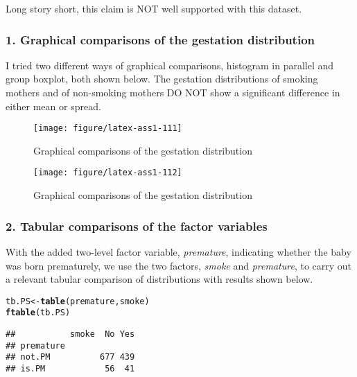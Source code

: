 \documentclass{article}\usepackage{graphicx, color}
\makeatletter
\newcommand{\hlfunctioncall}[1]{\textcolor[rgb]{0.501960784313725,0,0.329411764705882}{\textbf{#1}}}%
\newenvironment{kframe}{%
 \def\at@end@of@kframe{}%
 \ifinner\ifhmode%
  \def\at@end@of@kframe{\end{minipage}}%
  \begin{minipage}{\columnwidth}%
 \fi\fi%
 \def\FrameCommand##1{\hskip\@totalleftmargin \hskip-\fboxsep
 \colorbox{shadecolor}{##1}\hskip-\fboxsep
     \hskip-\linewidth \hskip-\@totalleftmargin \hskip\columnwidth}%
 \MakeFramed {\advance\hsize-\width
   \@totalleftmargin\z@ \linewidth\hsize
   \@setminipage}}%
 {\par\unskip\endMakeFramed%
 \at@end@of@kframe}
\newenvironment{knitrout}{}{} %
\makeatother
\begin{document}
\hspace{12 pt} Long story short, this claim is NOT well supported with
this dataset.

\subsubsection*{1. Graphical comparisons of the gestation distribution}
\hspace{12 pt} I tried two different ways of graphical comparisons,
histogram in parallel and group boxplot, both shown below. The gestation distributions
of smoking mothers and of non-smoking mothers DO NOT show a
significant difference in either mean or spread. 

\begin{knitrout}
\color{fgcolor}\begin{figure}[]


{\centering \texttt{[image: figure/latex-ass1-111]} 

}

\caption[Graphical comparisons of the gestation distribution]{Graphical comparisons of the gestation distribution\label{fig:ass1-111}}
\end{figure}

\begin{figure}[]


{\centering \texttt{[image: figure/latex-ass1-112]} 

}

\caption[Graphical comparisons of the gestation distribution]{Graphical comparisons of the gestation distribution\label{fig:ass1-112}}
\end{figure}


\end{knitrout}


\subsubsection*{2. Tabular comparisons of the factor variables}
\hspace{12 pt} With the added two-level factor variable,
\textit{premature}, indicating whether the baby was born prematurely,
we use the two factors, \textit{smoke} and \textit{premature}, to
carry out a relevant tabular comparison of distributions with results
shown below. 

\begin{knitrout}
\color{fgcolor}\begin{kframe}
\begin{alltt}
tb.PS <- \hlfunctioncall{table}(premature, smoke)
\hlfunctioncall{ftable}(tb.PS)
\end{alltt}
\begin{verbatim}
##           smoke  No Yes
## premature              
## not.PM          677 439
## is.PM            56  41
\end{verbatim}
\end{kframe}
\end{knitrout}
\end{document}
